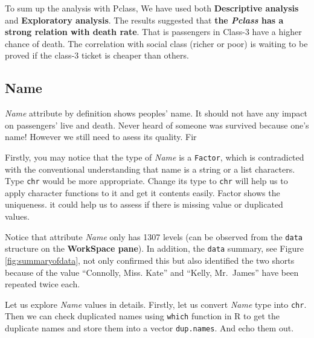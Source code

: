 \documentclass[
]{book}
\newenvironment{Shaded}{\begin{snugshade}}{\end{snugshade}}
\newcommand{\CommentTok}[1]{\textcolor[rgb]{0.56,0.35,0.01}{\textit{#1}}}
\newcommand{\KeywordTok}[1]{\textcolor[rgb]{0.13,0.29,0.53}{\textbf{#1}}}
\newcommand{\NormalTok}[1]{#1}
\newcommand{\OperatorTok}[1]{\textcolor[rgb]{0.81,0.36,0.00}{\textbf{#1}}}
\newcommand{\StringTok}[1]{\textcolor[rgb]{0.31,0.60,0.02}{#1}}
\begin{document}
To sum up the analysis with Pclass, We have used both \textbf{Descriptive analysis} and \textbf{Exploratory analysis}. The results suggested that \textbf{the \emph{Pclass} has a strong relation with death rate}. That is passengers in Class-3 have a higher chance of death. The correlation with social class (richer or poor) is waiting to be proved if the class-3 ticket is cheaper than others.

\hypertarget{name}{%
\subsection{Name}\label{name}}

\emph{Name} attribute by definition shows peoples' name. It should not have any impact on passengers' live and death. Never heard of someone was survived because one's name!
However we still need to asess its quality. Fir

Firstly, you may notice that the type of \emph{Name} is a \texttt{Factor}, which is contradicted with the conventional understanding that name is a string or a list characters. Type \texttt{chr} would be more appropriate. Change its type to \texttt{chr} will help us to apply character functions to it and get it contents easily. Factor shows the uniqueness. it could help us to assess if there is missing value or duplicated values.

Notice that attribute \emph{Name} only has 1307 levels (can be observed from the \texttt{data} structure on the \textbf{WorkSpace pane}). In addition, the \texttt{data} summary, see Figure \ref{fig:summaryofdata}, not only confirmed this but also identified the two shorts because of the value ``Connolly, Miss. Kate'' and ``Kelly, Mr.~James'' have been repeated twice each.

Let us explore \emph{Name} values in details.
Firstly, let us convert \emph{Name} type into \texttt{chr}. Then we can check duplicated names using \texttt{which} function in R to get the duplicate names and store them into a vector \texttt{dup.names}. And echo them out.

\begin{Shaded}
\end{Shaded}
\end{document}
